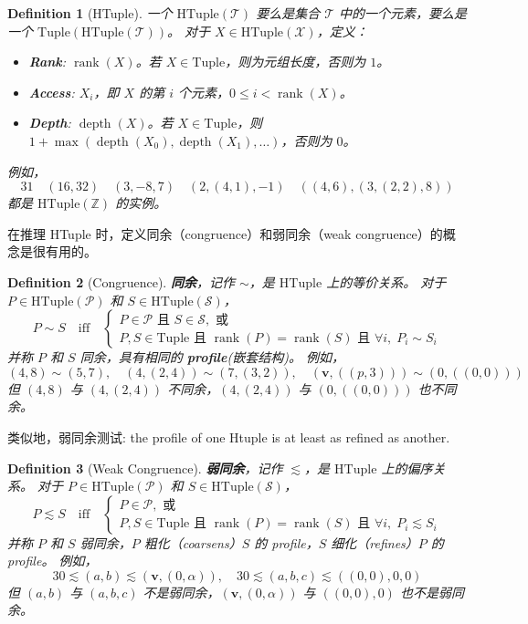 \documentclass{article}
\newtheorem{definition}{Definition}[section]
\begin{document}
\begin{definition}[HTuple]
一个 $\mathrm{HTuple}(\mathcal{T})$ 要么是集合 $\mathcal{T}$ 中的一个元素，要么是一个 $\mathrm{Tuple}(\mathrm{HTuple}(\mathcal{T}))$。
对于 $X \in \mathrm{HTuple}(\mathcal{X})$，定义：
\begin{itemize}
\item \textbf{Rank}: $\operatorname{rank}(X)$。若 $X \in \mathrm{Tuple}$，则为元组长度，否则为 $1$。
\item \textbf{Access}: $X_i$，即 $X$ 的第 $i$ 个元素，$0 \le i < \operatorname{rank}(X)$。
\item \textbf{Depth}: $\operatorname{depth}(X)$。若 $X \in \mathrm{Tuple}$，则 $1 + \max(\operatorname{depth}(X_0), \operatorname{depth}(X_1),\ldots)$，否则为 $0$。
\end{itemize}
例如，
\[
31 \quad (16,32) \quad (3,-8,7) \quad (2,(4,1),-1) \quad ((4,6),(3,(2,2),8))
\]
都是 $\mathrm{HTuple}(\mathbb{Z})$ 的实例。
\end{definition}
在推理 HTuple 时，定义同余（congruence）和弱同余（weak congruence）的概念是很有用的。
\begin{definition}[Congruence]
\textbf{同余}，记作 $\sim$，是 $\mathrm{HTuple}$ 上的等价关系。
对于 $P \in \mathrm{HTuple}(\mathcal{P})$ 和 $S \in \mathrm{HTuple}(\mathcal{S})$，
\[
P \sim S \quad \text{iff} \quad
\begin{cases}
P \in \mathcal{P} \text{ 且 } S \in \mathcal{S}, \text{ 或} \\
P, S \in \mathrm{Tuple} \text{ 且 } \operatorname{rank}(P) = \operatorname{rank}(S) \text{ 且 } \forall i,\; P_i \sim S_i
\end{cases}
\]
并称 $P$ 和 $S$ 同余，具有相同的 \textbf{profile}(嵌套结构)。
例如，
\[
(4,8)\sim(5,7),\quad (4,(2,4))\sim(7,(3,2)),\quad (\mathbf{v},((p,3)))\sim(0,((0,0)))
\]
但 $(4,8)$ 与 $(4,(2,4))$ 不同余，$(4,(2,4))$ 与 $(0,((0,0)))$ 也不同余。
\end{definition}
类似地，弱同余测试: the profile of one Htuple is at least as refined as another.
\begin{definition}[Weak Congruence]
\textbf{弱同余}，记作 $\lesssim$，是 $\mathrm{HTuple}$ 上的偏序关系。
对于 $P \in \mathrm{HTuple}(\mathcal{P})$ 和 $S \in \mathrm{HTuple}(\mathcal{S})$，
\[
P \lesssim S \quad \text{iff} \quad
\begin{cases}
P \in \mathcal{P}, \text{ 或} \\
P, S \in \mathrm{Tuple} \text{ 且 } \operatorname{rank}(P) = \operatorname{rank}(S) \text{ 且 } \forall i,\; P_i \lesssim S_i
\end{cases}
\]
并称 $P$ 和 $S$ 弱同余，$P$ 粗化（coarsens）$S$ 的 profile，$S$ 细化（refines）$P$ 的 profile。
例如，
\[
30 \lesssim (a,b) \lesssim (\mathbf{v},(0,\alpha)),\quad 30 \lesssim (a,b,c) \lesssim ((0,0),0,0)
\]
但 $(a,b)$ 与 $(a,b,c)$ 不是弱同余，$(\mathbf{v},(0,\alpha))$ 与 $((0,0),0)$ 也不是弱同余。
\end{definition}
\end{document}
